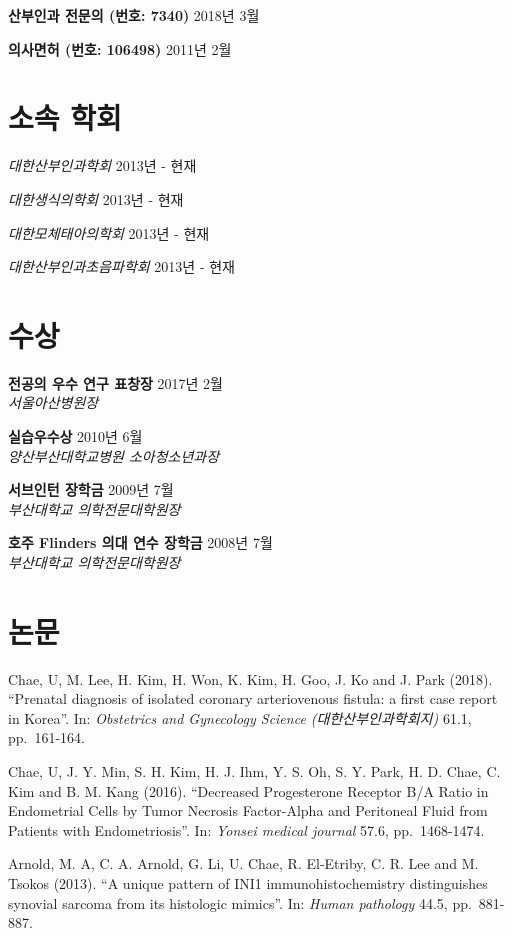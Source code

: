 \documentclass[12pt,]{article}
\begin{document}
\textbf{산부인과 전문의 (번호: 7340)} \hfill 2018년 3월

\textbf{의사면허 (번호: 106498)} \hfill 2011년 2월

\hypertarget{-}{%
\section{소속 학회}\label{-}}

\emph{대한산부인과학회} \hfill 2013년 - 현재

\emph{대한생식의학회} \hfill 2013년 - 현재

\emph{대한모체태아의학회} \hfill 2013년 - 현재

\emph{대한산부인과초음파학회} \hfill 2013년 - 현재

\pagebreak

\section{수상}

\textbf{전공의 우수 연구 표창장} \hfill 2017년 2월\\
\emph{서울아산병원장}

\textbf{실습우수상} \hfill 2010년 6월\\
\emph{양산부산대학교병원 소아청소년과장}

\textbf{서브인턴 장학금} \hfill 2009년 7월\\
\emph{부산대학교 의학전문대학원장}

\textbf{호주 Flinders 의대 연수 장학금} \hfill 2008년 7월\\
\emph{부산대학교 의학전문대학원장}

\section{논문}

Chae, U, M. Lee, H. Kim, H. Won, K. Kim, H. Goo, J. Ko and J. Park
(2018). ``Prenatal diagnosis of isolated coronary arteriovenous fistula:
a first case report in Korea''. In: \emph{Obstetrics and Gynecology
Science (대한산부인과학회지)} 61.1, pp.~161-164.

Chae, U, J. Y. Min, S. H. Kim, H. J. Ihm, Y. S. Oh, S. Y. Park, H. D.
Chae, C. Kim and B. M. Kang (2016). ``Decreased Progesterone Receptor
B/A Ratio in Endometrial Cells by Tumor Necrosis Factor-Alpha and
Peritoneal Fluid from Patients with Endometriosis''. In: \emph{Yonsei
medical journal} 57.6, pp.~1468-1474.

Arnold, M. A, C. A. Arnold, G. Li, U. Chae, R. El-Etriby, C. R. Lee and
M. Tsokos (2013). ``A unique pattern of INI1 immunohistochemistry
distinguishes synovial sarcoma from its histologic mimics''. In:
\emph{Human pathology} 44.5, pp.~881-887.
\end{document}
